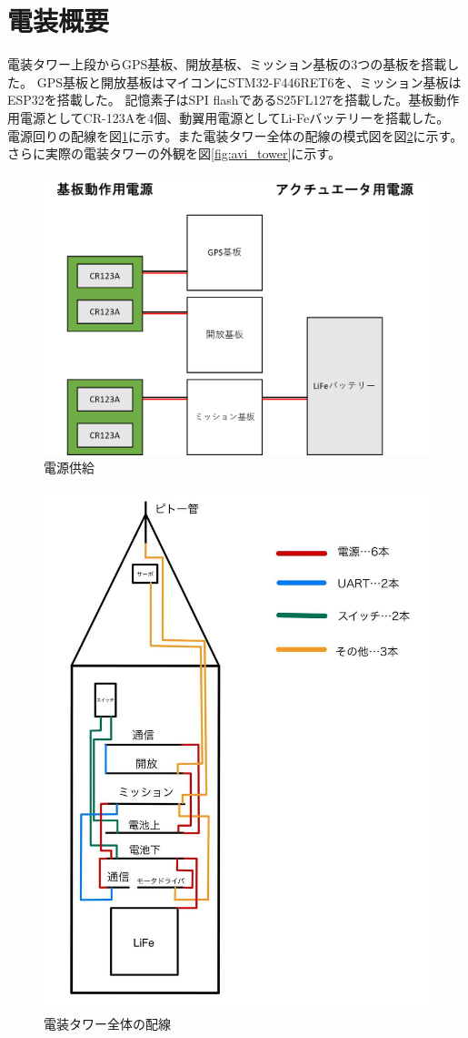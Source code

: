 \documentclass[a4paper,11pt,titlepage,uplatex]{jsarticle}
\begin{document}
\newpage
\section{電装概要}
電装タワー上段からGPS基板、開放基板、ミッション基板の3つの基板を搭載した。
GPS基板と開放基板はマイコンにSTM32-F446RET6を、ミッション基板はESP32を搭載した。
記憶素子はSPI flashであるS25FL127を搭載した。基板動作用電源としてCR-123Aを4個、動翼用電源としてLi-Feバッテリーを搭載した。
電源回りの配線を図\ref{fig:battrey}に示す。また電装タワー全体の配線の模式図を図\ref{fig:tower_all}に示す。
さらに実際の電装タワーの外観を図\ref{fig:avi_tower}に示す。

\begin{figure}[H]
	\centering
	\includegraphics[width=0.8\linewidth]{pic_avi/battery.png}
	\caption{電源供給}
	\label{fig:battrey}
\end{figure}

\begin{figure}[H]
	\centering
	\includegraphics[width=0.5\linewidth]{pic_avi/avi_tower_line.jpg}
	\caption{電装タワー全体の配線}
	\label{fig:tower_all}
\end{figure}
\end{document}
